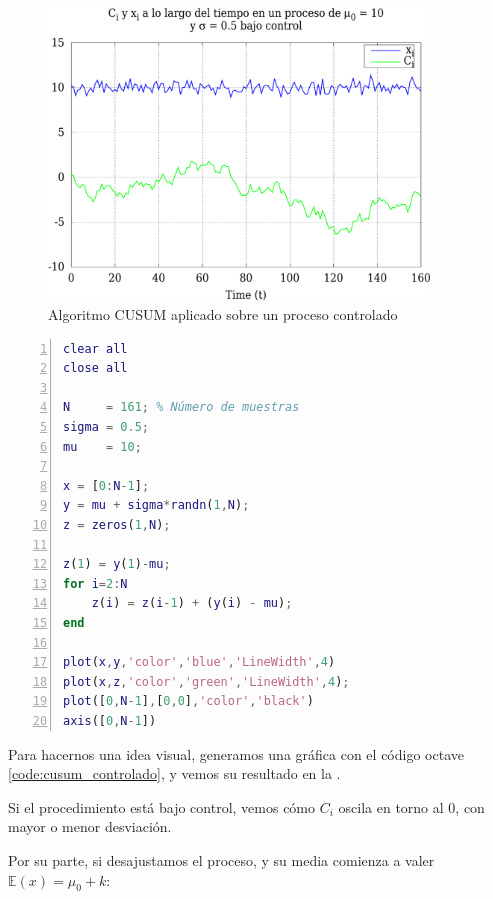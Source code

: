 \begin{figure}[htbp]
\centering
\includegraphics[width=0.9\textwidth]{CapituloCusum/Figuras/ejemploCusumControlado_crop}
\caption{Algoritmo CUSUM aplicado sobre un proceso controlado}
\end{figure}
%

\begin{lstlisting}[language=Matlab,caption={Algoritmo CUSUM en procesos bajo control}, breaklines=true, 
label=code:cusum_controlado,numbers=left,float=hbtp]
clear all
close all

N     = 161; % Número de muestras
sigma = 0.5; 
mu    = 10;

x = [0:N-1];
y = mu + sigma*randn(1,N);
z = zeros(1,N);

z(1) = y(1)-mu;
for i=2:N
    z(i) = z(i-1) + (y(i) - mu);
end

plot(x,y,'color','blue','LineWidth',4)
plot(x,z,'color','green','LineWidth',4);
plot([0,N-1],[0,0],'color','black')
axis([0,N-1])
\end{lstlisting}

Para hacernos una idea visual, generamos una gráfica con el código octave \autoref{code:cusum_controlado}, y vemos su 
resultado en la .

Si el procedimiento está bajo control, vemos cómo $C_i$ oscila en torno al 0, con mayor o menor desviación.

Por su parte, si desajustamos el proceso, y su media comienza a valer $\mathbb{E}(x) = \mu_0 + k$:

